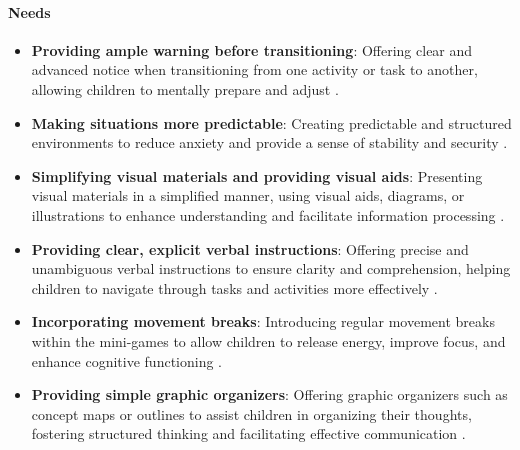 \paragraph{Needs}
\begin{itemize}
    \item \textbf{Providing ample warning before transitioning}: Offering clear and advanced notice when transitioning from one activity or task to another, allowing children to mentally prepare and adjust \cite{understood_accommodations_2024}.
    \item \textbf{Making situations more predictable}: Creating predictable and structured environments to reduce anxiety and provide a sense of stability and security \cite{understood_accommodations_2024}.
    \item \textbf{Simplifying visual materials and providing visual aids}: Presenting visual materials in a simplified manner, using visual aids, diagrams, or illustrations to enhance understanding and facilitate information processing \cite{understood_nvld_2024}.
    \item \textbf{Providing clear, explicit verbal instructions}: Offering precise and unambiguous verbal instructions to ensure clarity and comprehension, helping children to navigate through tasks and activities more effectively \cite{understood_accommodations_2024}.
    \item \textbf{Incorporating movement breaks}: Introducing regular movement breaks within the mini-games to allow children to release energy, improve focus, and enhance cognitive functioning \cite{understood_nvld_2024}.
    \item \textbf{Providing simple graphic organizers}: Offering graphic organizers such as concept maps or outlines to assist children in organizing their thoughts, fostering structured thinking and facilitating effective communication \cite{understood_accommodations_2024}.
\end{itemize}
